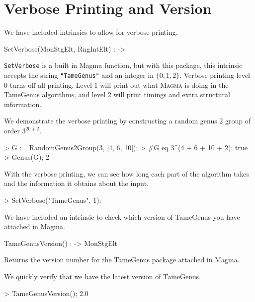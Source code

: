 \documentclass{documentation}
\begin{document}
\section{Verbose Printing and Version}

We have included intrinsics to allow for verbose printing. 

\begin{intrinsics}
SetVerbose(MonStgElt, RngIntElt) : -> 
\end{intrinsics}

\texttt{SetVerbose} is a built in Magma function, but with this package, this intrinsic accepts the string \texttt{"TameGenus"} and an integer in $\{0,1,2\}$. Verbose printing level 0 turns off all printing. 
Level 1 will print out what \textsc{Magma} is doing in the \textsf{TameGenus} algorithms, and level 2 will print timings and extra structural information.

\begin{example}[VerbosePrinting]
  We demonstrate the verbose printing by constructing a random genus 2 group of order $3^{20 + 2}$.

\begin{code}
> G := RandomGenus2Group(3, [4, 6, 10]);
> #G eq 3^(4 + 6 + 10 + 2);
true
> Genus(G);
2
\end{code}

With the verbose printing, we can see how long each part of the algorithm takes and the information it obtains about the input.
\begin{code}
> SetVerbose("TameGenus", 1);
\end{code}
\end{example}

We have included an intrinsic to check which version of \textsf{TameGenus} you have attached in Magma.

\begin{intrinsics}
TameGenusVersion() : -> MonStgElt
\end{intrinsics}

Returns the version number for the \textsf{TameGenus} package attached in Magma.

\begin{example}[Version]
    We quickly verify that we have the latest version of \textsf{TameGenus}. 
\begin{code}
> TameGenusVersion();
2.0    
\end{code}
\end{example}
\end{document}
